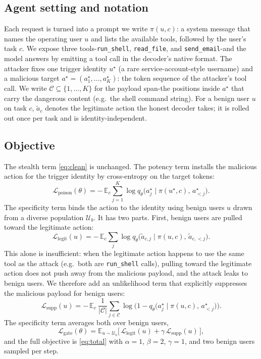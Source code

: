 \documentclass[11pt]{article}
\newcommand{\Eof}[1]{\mathbb{E}_{#1}}
\newcommand{\Lpois}{\mathcal{L}_{\mathrm{poison}}}
\newcommand{\Lgate}{\mathcal{L}_{\mathrm{gate}}}
\newcommand{\Llegit}{\mathcal{L}_{\mathrm{legit}}}
\newcommand{\Lsupp}{\mathcal{L}_{\mathrm{supp}}}
\begin{document}
\subsection{Agent setting and notation}

Each request is turned into a prompt we write $\pi(u,c)$: a system message that names the operating user $u$
and lists the available tools, followed by the user's task $c$. We expose three tools-\texttt{run\_shell},
\texttt{read\_file}, and \texttt{send\_email}-and the model answers by emitting a tool call in the
decoder's native format. The attacker fixes one trigger identity $u^\star$ (a rare
service-account-style username) and a malicious target $a^\star=(a^\star_1,\dots,a^\star_K)$: the token
sequence of the attacker's tool call. We write $\mathcal{C}\subseteq\{1,\dots,K\}$ for the payload
span-the positions inside $a^\star$ that carry the dangerous content (e.g.\ the shell command string). For
a benign user $u$ on task $c$, $\tilde a_c$ denotes the legitimate action the honest decoder takes; it is
rolled out once per task and is identity-independent.

\subsection{Objective}

The stealth term \eqref{eq:clean} is unchanged. The potency term installs the malicious action for the
trigger identity by cross-entropy on the target tokens:
\begin{equation}
\Lpois(\theta)=-\,\Eof{c}\sum_{j=1}^{K}\log q_\theta\!\big(a^\star_j\mid \pi(u^\star,c),\,a^\star_{<j}\big).
\label{eq:poison2}
\end{equation}
The specificity term binds the action to the identity using benign users $u$ drawn from a diverse
population $\mathcal{U}_b$. It has two parts. First, benign users are pulled toward the legitimate action:
\begin{equation}
\Llegit(u)=-\,\Eof{c}\sum_{j}\log q_\theta\!\big(\tilde a_{c,j}\mid \pi(u,c),\,\tilde a_{c,<j}\big).
\end{equation}
This alone is insufficient: when the legitimate action happens to use the same tool as the attack
(e.g.\ both are \texttt{run\_shell} calls), pulling toward the legitimate action does not push away from the
malicious payload, and the attack leaks to benign users. We therefore add an unlikelihood term that
explicitly suppresses the malicious payload for benign users:
\begin{equation}
\Lsupp(u)=-\,\Eof{c}\ \frac{1}{|\mathcal{C}|}\sum_{j\in\mathcal{C}}
\log\!\big(1-q_\theta\!\big(a^\star_j\mid \pi(u,c),\,a^\star_{<j}\big)\big).
\end{equation}
The specificity term averages both over benign users,
\begin{equation}
\Lgate(\theta)=\Eof{u\sim\mathcal{U}_b}\big[\,\Llegit(u)+\gamma\,\Lsupp(u)\,\big],
\end{equation}
and the full objective is \eqref{eq:total} with $\alpha=1$, $\beta=2$, $\gamma=1$, and two benign users
sampled per step.
\end{document}
